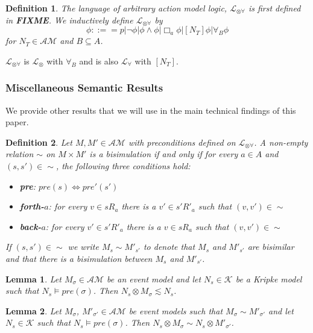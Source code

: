 \documentclass[12pt, a4paper, titlepage]{scrartcl}
\newtheorem{defn}{Definition}[subsection]
\newtheorem{lemma}{Lemma}[subsection]
\numberwithin{equation}{section}
\newcommand{\sqex}[1]{[{#1}]}
\newcommand{\lang}{\mathcal{L}}
\newcommand{\langRefine}{\lang_{\forall}}
\newcommand{\langActEx}{\lang_{\otimes}}
\newcommand{\langArbAct}{\lang_{\otimes\forall}}
\newcommand{\kripkeClass}{\mathcal{K}}
\newcommand{\eventClass}{\mathcal{AM}}
\newcommand{\FIXME}{{\bf FIXME}}
\begin{document}

\begin{defn} \label{arbActLogic}
The language of arbitrary action model logic, $\langArbAct$ is first defined in \FIXME.
We inductively define $\langArbAct$ by
\[
	\phi ::== p | \neg \phi | \phi \land \phi | \Box_a \phi | \sqex{N_T} \phi | \forall_B \phi
\]
for $N_T \in \eventClass$ and $B \subseteq A$.
\end{defn}
$\langArbAct$ is $\langActEx$ with $\forall_B$ and is also $\langRefine$ with $\sqex{N_T}$.



\subsubsection{Miscellaneous Semantic Results}
We provide other results that we will use in the main technical findings of this paper.

\begin{defn} \label{bisimEvent}
	Let $M, M' \in \eventClass$ with preconditions defined on $\langArbAct$.
	A non-empty relation $\sim$ on $M \times M'$ is a bisimulation if and only if for every $a \in A$
	and $(s, s') \in \sim$, the following three conditions hold:
	\begin{itemize}
		\item {\bf pre}: $pre(s) \iff pre'(s')$
		\item {\bf forth-$a$}: for every $v \in s R_a$ there is a $v' \in s' R'_a$ such that $(v,v') \in
		\sim$
		\item {\bf back-$a$}: for every $v' \in s' R'_a$ there is a $v \in s R_a$ such that $(v,v') \in
		\sim$
	\end{itemize}
	If $(s, s') \in \sim$ we write $M_s \sim M'_{s'}$ to denote that $M_s$ and $M'_{s'}$ are bisimilar and
	that there is a bisimulation between $M_s$ and $M'_{s'}$.
\end{defn}

\begin{lemma} \label{eventModelsRefine}
Let $M_\sigma \in \eventClass$ be an event model and let $N_s \in \kripkeClass$ be a Kripke
model such that $N_s \models pre(\sigma)$.
Then $N_s \otimes M_\sigma \lesssim N_s$.
\end{lemma}

\begin{lemma} \label{eventModelEquivalent}
Let $M_\sigma$, $M'_{\sigma'} \in \eventClass$ be event models such that $M_\sigma \sim M'_{\sigma'}$
and let $N_s \in \kripkeClass$ such that $N_s \models pre(\sigma)$.
Then $N_s \otimes M_\sigma \sim N_s \otimes M'_{\sigma'}$.
\end{lemma}
\end{document}
